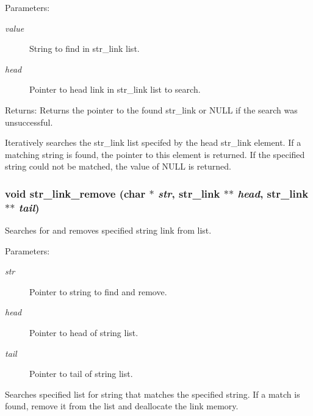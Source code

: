 \begin{Desc}
\item[Parameters:]
\begin{description}
\item[{\em value}]String to find in str\_\-link list. \item[{\em head}]Pointer to head link in str\_\-link list to search. \end{description}
\end{Desc}
\begin{Desc}
\item[Returns:]Returns the pointer to the found str\_\-link or NULL if the search was unsuccessful.\end{Desc}
Iteratively searches the str\_\-link list specifed by the head str\_\-link element. If a matching string is found, the pointer to this element is returned. If the specified string could not be matched, the value of NULL is returned. 
\subsubsection{\setlength{\rightskip}{0pt plus 5cm}void str\_\-link\_\-remove (char $\ast$ {\em str}, {\bf str\_\-link} $\ast$$\ast$ {\em head}, {\bf str\_\-link} $\ast$$\ast$ {\em tail})}\label{link_8c_a16}


Searches for and removes specified string link from list. 

\begin{Desc}
\item[Parameters:]
\begin{description}
\item[{\em str}]Pointer to string to find and remove. \item[{\em head}]Pointer to head of string list. \item[{\em tail}]Pointer to tail of string list.\end{description}
\end{Desc}
Searches specified list for string that matches the specified string. If a match is found, remove it from the list and deallocate the link memory. 